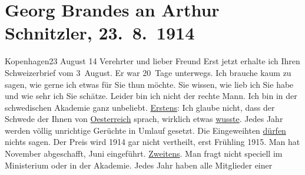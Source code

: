                \section[Georg Brandes an Arthur Schnitzler, 23. 8. 1914]{ Georg Brandes an Arthur Schnitzler, 23. 8. 1914}\nopagebreak{}\rehead{ }\begin{ledgroupsized}[t]{13cm}\normalsize\beginnumbering \toendnotes[C]{\smallbreak\pagebreak[2]} 
\toendnotes[C]{\smallbreak}\pstart
           \raggedleft{}{\pb}Kopenhagen23 August 14\pend
           \pstart{}Verehrter und lieber Freund\pend\pstart
           Erst jetzt erhalte ich Ihren Schweizerbrief vom
                  3 August. Er war 20 Tage unterwegs.\pend
           \pstart
           Ich brauche kaum zu sagen, wie gerne ich etwas für Sie thun möchte. Sie wissen, wie
               lieb ich Sie habe und wie sehr ich Sie schätze.\pend
           \pstart
           Leider bin ich nicht der rechte Mann. Ich bin in der schwedischen Akademie ganz unbeliebt.\pend
           \pstart
           \uline{Erstens}: Ich glaube nicht, dass der
                  Schwede der Ihnen von \uline{Oesterreich} sprach, wirklich etwas \uline{wusste}. Jedes Jahr
               werden völlig unrichtige Gerüchte in Umlauf gesetzt. Die Eingeweihten \uline{dürfen} nichts sagen. Der Preis wird 1914 gar
               nicht vertheilt, erst Frühling 1915. Man hat November abgeschafft, Juni
               eingeführt.\pend
           \pstart
           {\pb}\uline{Zweitens}. Man fragt nicht speciell im Ministerium oder in der Akademie. Jedes Jahr haben alle Mitglieder einer

\end{ledgroupsized}

